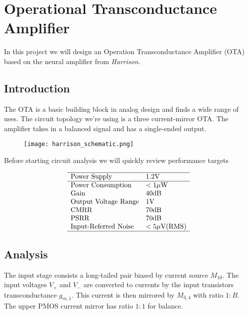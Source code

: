 \documentclass[../main.tex]{subfiles}
\begin{document}
\section{Operational Transconductance Amplifier}

In this project we will design an Operation Transconductance Amplifier (OTA) based on the neural amplifier from \textit{Harrison}\cite{harrison}.

\subsection{Introduction}

The OTA is a basic building block in analog design and finds a wide range of uses. The circuit topology we're using is a three current-mirror OTA. The amplifier takes in a balanced signal and has a single-ended output.

\begin{figure}[h]
    \centering
    \texttt{[image: harrison\_schematic.png]}
\end{figure}

Before starting circuit analysis we will quickly review performance targets

\begin{displaymath}
    \begin{array}{l l}
        \hline
        \text{Power Supply} & 1.2 \si{V} \\
        \hline
        \text{Power Consumption} & < 1 \si{\mu W} \\
        \text{Gain} & 40 \si{dB} \\
        \text{Output Voltage Range} & 1 \si{V} \\
        \text{CMRR} & 70 \si{dB} \\
        \text{PSRR} & 70 \si{dB} \\
        \text{Input-Referred Noise} & < 5 \si{\mu V (RMS)} \\
        \hline
    \end{array}
\end{displaymath}

\subsection{Analysis}

The input stage consists a long-tailed pair biased by current source $M_{10}$. The input voltages $V_+$ and $V_-$ are converted to currents by the input transistors transconductance $g_{m,1}$. This current is then mirrored by $M_{3,4}$ with ratio $1:B$. The upper PMOS current mirror has ratio $1:1$ for balance. \vspace*{10pt}
\end{document}
